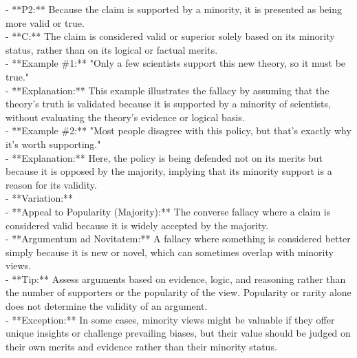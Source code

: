 \documentclass[a4paper,12pt,single,pdftex]{scrartcl}
\begin{document}
    
        - **P2:** Because the claim is supported by a minority, it is presented as being more valid or true.
    \\

    
        - **C:** The claim is considered valid or superior solely based on its minority status, rather than on its logical or factual merits.
    \\

    
      - **Example \#1:** "Only a few scientists support this new theory, so it must be true."
    \\

    
      - **Explanation:** This example illustrates the fallacy by assuming that the theory’s truth is validated because it is supported by a minority of scientists, without evaluating the theory’s evidence or logical basis.
    \\

    
      - **Example \#2:** "Most people disagree with this policy, but that’s exactly why it’s worth supporting."
    \\

    
      - **Explanation:** Here, the policy is being defended not on its merits but because it is opposed by the majority, implying that its minority support is a reason for its validity.
    \\

    
      - **Variation:**
    \\

    
        - **Appeal to Popularity (Majority):** The converse fallacy where a claim is considered valid because it is widely accepted by the majority.
    \\

    
        - **Argumentum ad Novitatem:** A fallacy where something is considered better simply because it is new or novel, which can sometimes overlap with minority views.
    \\

    
      - **Tip:** Assess arguments based on evidence, logic, and reasoning rather than the number of supporters or the popularity of the view. Popularity or rarity alone does not determine the validity of an argument.
    \\

    
      - **Exception:** In some cases, minority views might be valuable if they offer unique insights or challenge prevailing biases, but their value should be judged on their own merits and evidence rather than their minority status.
    \\
\end{document}
